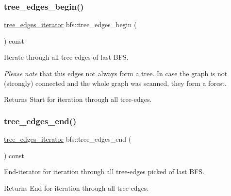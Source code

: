 \subsubsection{\texorpdfstring{tree\+\_\+edges\+\_\+begin()}{tree\_edges\_begin()}}
{\footnotesize\ttfamily \mbox{\hyperlink{classbfs_aa0b58a03ca2fc32117948ab27a806bd1}{tree\+\_\+edges\+\_\+iterator}} bfs\+::tree\+\_\+edges\+\_\+begin (\begin{DoxyParamCaption}{ }\end{DoxyParamCaption}) const\hspace{0.3cm}{\ttfamily [inline]}}



Iterate through all tree-\/edges of last B\+FS. 

{\itshape Please} {\itshape note} that this edges not always form a tree. In case the graph is not (strongly) connected and the whole graph was scanned, they form a forest.

\begin{DoxyReturn}{Returns}
Start for iteration through all tree-\/edges. 
\end{DoxyReturn}
\mbox{\label{classbfs_a7db47d5d68e21e95fd548beea1a8db2b}} 
\subsubsection{\texorpdfstring{tree\+\_\+edges\+\_\+end()}{tree\_edges\_end()}}
{\footnotesize\ttfamily \mbox{\hyperlink{classbfs_aa0b58a03ca2fc32117948ab27a806bd1}{tree\+\_\+edges\+\_\+iterator}} bfs\+::tree\+\_\+edges\+\_\+end (\begin{DoxyParamCaption}{ }\end{DoxyParamCaption}) const\hspace{0.3cm}{\ttfamily [inline]}}



End-\/iterator for iteration through all tree-\/edges picked of last B\+FS. 

\begin{DoxyReturn}{Returns}
End for iteration through all tree-\/edges. 
\end{DoxyReturn}
\mbox{\label{classbfs_a0e45c8fe90e54bffe18b308868ccc111}} 

